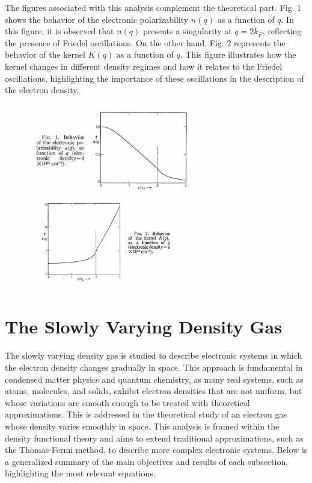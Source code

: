 \documentclass[%
 preprint, linenumbers,
 amsmath,amssymb,
 aps, physrev,
]{revtex4-2}
\begin{document}
The figures associated with this analysis complement the theoretical part. Fig. 1 shows the behavior of the electronic polarizability \( n(q) \) as a function of \( q \). In this figure, it is observed that \( n(q) \) presents a singularity at \( q = 2k_F \), reflecting the presence of Friedel oscillations. On the other hand, Fig. 2 represents the behavior of the kernel \( K(q) \) as a function of \( q \). This figure illustrates how the kernel changes in different density regimes and how it relates to the Friedel oscillations, highlighting the importance of these oscillations in the description of the electron density.
\begin{figure}[htb]
    \centering
    \begin{minipage}[b]{0.49\textwidth}
    \centering
    \includegraphics[height=4cm]{1.jpg}
    \end{minipage}
    \hfill
    \begin{minipage}[b]{0.49\textwidth}
    \centering
    \includegraphics[height=4cm]{2.jpg}
    \end{minipage}
\end{figure}
\section{The Slowly Varying Density Gas}
The slowly varying density gas is studied to describe electronic systems in which the electron density changes gradually in space. This approach is fundamental in condensed matter physics and quantum chemistry, as many real systems, such as atoms, molecules, and solids, exhibit electron densities that are not uniform, but whose variations are smooth enough to be treated with theoretical approximations. This is addressed in the theoretical study of an electron gas whose density varies smoothly in space. This analysis is framed within the density functional theory and aims to extend traditional approximations, such as the Thomas-Fermi method, to describe more complex electronic systems. Below is a generalized summary of the main objectives and results of each subsection, highlighting the most relevant equations.
\end{document}
